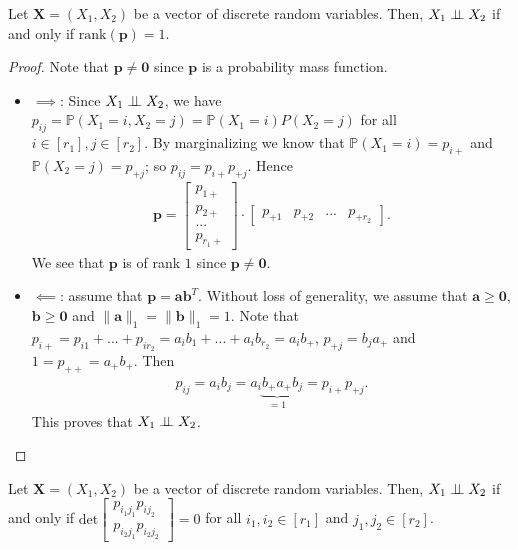 \begin{lemma}
  Let \( \mathbf X = (X_1, X_2) \) be a vector of discrete random variables. Then, \( X_1 \perp \!\!\! \perp X_2 \) if and only if \( \mathrm{rank}(\mathbf p) = 1 \).
\end{lemma}
\begin{proof}Note that \( \mathbf p \neq \mathbf 0 \) since \( \mathbf p \) is a probability mass function.
  \begin{itemize}
    \item \( \implies \): Since \( X_1 \perp \!\!\! \perp X_2 \), we have \( p_{ij} = \mathbb{P}(X_1 = i, X_2 = j) = \mathbb{P}(X_1 = i) P(X_2 = j) \) for all \( i \in [r_1],j \in [r_2] \). By marginalizing we know that \( \mathbb P(X_1 = i) = p_{i+} \) and \( \mathbb P(X_2 = j) = p_{+j} \); so \( p_{ij} = p_{i+}p_{+j} \). Hence 
    \begin{align*}
      \mathbf p = \begin{bmatrix}
        p_{1+} \\ p_{2+} \\ ... \\ p_{r_1 +}
      \end{bmatrix} \cdot \begin{bmatrix}
        p_{+1} & p_{+2} & ... & p_{+r_2}
      \end{bmatrix}.
    \end{align*}
    We see that \( \mathbf p \) is of rank \( 1 \) since \( \mathbf p \neq \mathbf 0 \).

    \item \( \impliedby \): assume that \( \mathbf p = \mathbf a \mathbf b^T \). Without loss of generality, we assume that \( \mathbf a \geq \mathbf 0 \), \( \mathbf b \geq \mathbf 0 \) and \( \lVert \mathbf a \rVert_1 = \lVert \mathbf b \rVert_1 = 1 \). Note that \(  p_{i+} = p_{i1} + ... + p_{ir_2} = a_i b_1 + ... + a_i b_{r_2} = a_i  b_+  \), \(  p_{+j} = b_j  a_+ \) and \( 1 = p_{++}  = a_+ b_+\). Then 
    \begin{align*}
      p_{ij} = a_i  b_j = a_i \underbrace{b_+ a_+}_{=1} b_j = p_{i+}  p_{+j}.
    \end{align*}
    This proves that \( X_1 \perp \!\!\! \perp X_2 \).
  \end{itemize}
\end{proof}



\begin{cor}
  Let \( \mathbf X = (X_1, X_2) \) be a vector of discrete random variables. Then, \( X_1 \perp \!\!\! \perp X_2 \) if and only if \( \mathrm{det}\begin{bmatrix}
    p_{i_1j_1} p_{ij_2} \\ p_{i_2 j_1} p_{i_2 j_2}
\end{bmatrix}= 0 \) for all \( i_1, i_2 \in [r_1] \) and \( j_1,j_2 \in [r_2] \).
\end{cor}

